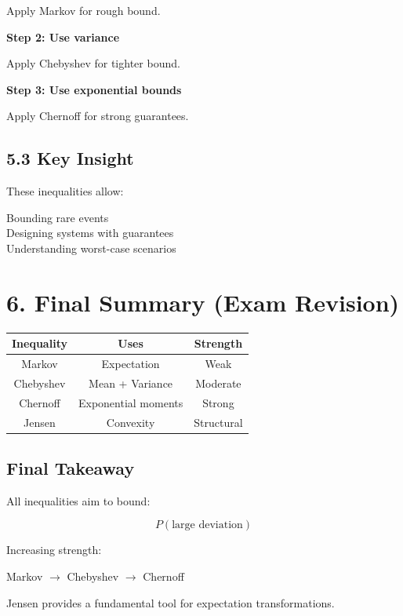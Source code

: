 \documentclass[12pt]{article}
\begin{document}
Apply Markov for rough bound.

\textbf{Step 2: Use variance}

Apply Chebyshev for tighter bound.

\textbf{Step 3: Use exponential bounds}

Apply Chernoff for strong guarantees.

\subsection*{5.3 Key Insight}

These inequalities allow:

Bounding rare events\\
Designing systems with guarantees\\
Understanding worst-case scenarios

\section*{6. Final Summary (Exam Revision)}

\begin{tabular}{|c|c|c|}
\hline
Inequality & Uses & Strength \\
\hline
Markov & Expectation & Weak \\
\hline
Chebyshev & Mean + Variance & Moderate \\
\hline
Chernoff & Exponential moments & Strong \\
\hline
Jensen & Convexity & Structural \\
\hline
\end{tabular}

\subsection*{Final Takeaway}

All inequalities aim to bound:

\[
P (\text{large deviation})
\]

Increasing strength:

Markov $\rightarrow$ Chebyshev $\rightarrow$ Chernoff

Jensen provides a fundamental tool for expectation transformations.
\end{document}
